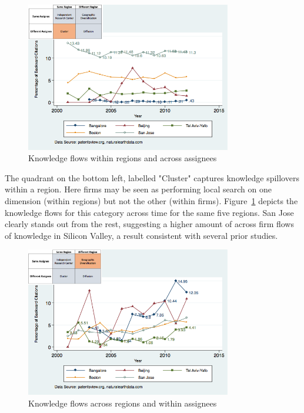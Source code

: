 \documentclass[parskip=full,11pt,letterpaper]{article}
\begin{document}
\begin{figure}[h!]
\begin{centering}
  \includegraphics[width=0.80\textwidth]{SMSSameRegionDiffAssigneeFlows}
  \caption{Knowledge flows within regions and across assignees}
  \label{fig:SMSSameRegionDiffAssigneeFlows}
\end{centering}
\end{figure}
The quadrant on the bottom left, labelled "Cluster" captures knowledge spillovers within a region. Here firms may be seen as performing local search on one dimension (within regions) but not the other (within firms). Figure~\ref{fig:SMSSameRegionDiffAssigneeFlows} depicts the knowledge flows for this category across time for the same five regions. San Jose clearly stands out from the rest, suggesting a higher amount of across firm flows of knowledge in Silicon Valley, a result consistent with several prior studies. \par
\begin{figure}[h!]
\begin{centering}
  \includegraphics[width=0.80\textwidth]{SMSDiffRegionSameAssigneeFlows}
  \caption{Knowledge flows across regions and within assignees}
  \label{fig:SMSDiffRegionSameAssigneeFlows}
\end{centering}
\end{figure}
\end{document}
